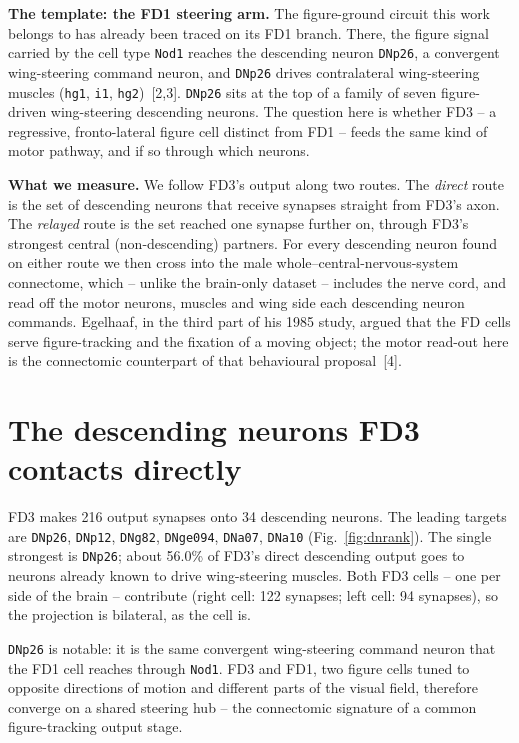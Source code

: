 \documentclass[11pt]{article}
\newcommand{\ttt}[1]{\texttt{#1}}
\begin{document}
\textbf{The template: the FD1 steering arm.}\quad
The figure-ground circuit this work belongs to has already been traced on its FD1 branch. There,
the figure signal carried by the cell type \ttt{Nod1} reaches the descending neuron \ttt{DNp26}, a
convergent wing-steering command neuron, and \ttt{DNp26} drives contralateral wing-steering muscles
(\ttt{hg1}, \ttt{i1}, \ttt{hg2})~[2,3]. \ttt{DNp26} sits at the top of a family of seven
figure-driven wing-steering descending neurons. The question here is whether FD3 -- a regressive,
fronto-lateral figure cell distinct from FD1 -- feeds the same kind of motor pathway, and if so
through which neurons.

\textbf{What we measure.}\quad
We follow FD3's output along two routes. The \emph{direct} route is the set of descending neurons
that receive synapses straight from FD3's axon. The \emph{relayed} route is the set reached one
synapse further on, through FD3's strongest central (non-descending) partners. For every descending
neuron found on either route we then cross into the male whole--central-nervous-system connectome,
which -- unlike the brain-only dataset -- includes the nerve cord, and read off the motor neurons,
muscles and wing side each descending neuron commands. Egelhaaf, in the third part of his 1985
study, argued that the FD cells serve figure-tracking and the fixation of a moving object; the motor
read-out here is the connectomic counterpart of that behavioural proposal~[4].

\section{The descending neurons FD3 contacts directly}

FD3 makes 216 output synapses onto 34 descending neurons. The leading targets are \ttt{DNp26}, \ttt{DNp12}, \ttt{DNg82}, \ttt{DNge094}, \ttt{DNa07}, \ttt{DNa10} (Fig.~\ref{fig:dnrank}). The single strongest is \ttt{DNp26}; about 56.0\% of FD3's direct descending output goes to neurons already known to drive wing-steering muscles. Both FD3 cells -- one per side of the brain -- contribute (right cell: 122 synapses; left cell: 94 synapses), so the projection is bilateral, as the cell is.

\ttt{DNp26} is notable: it is the same convergent wing-steering command neuron that the FD1 cell reaches through \ttt{Nod1}. FD3 and FD1, two figure cells tuned to opposite directions of motion and different parts of the visual field, therefore converge on a shared steering hub -- the connectomic signature of a common figure-tracking output stage.
\end{document}
